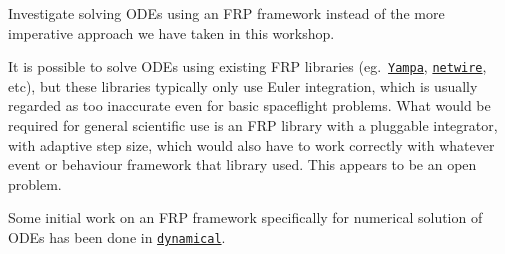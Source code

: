 \documentclass[12pt,openany]{book}
\newcommand{\hspackage}[1]{\href{http://hackage.haskell.org/package/#1}{\texttt{#1}}}
\begin{document}
Investigate solving ODEs using an FRP framework instead of the more imperative approach we have taken in this workshop.

It is possible to solve ODEs using existing FRP libraries (eg.\ \hspackage{Yampa}, \hspackage{netwire}, etc), but these libraries typically only use Euler integration, which is usually regarded as too inaccurate even for basic spaceflight problems. What would be required for general scientific use is an FRP library with a pluggable integrator, with adaptive step size, which would also have to work correctly with whatever event or behaviour framework that library used. This appears to be an open problem.

Some initial work on an FRP framework specifically for numerical solution of ODEs has been done in \href{https://github.com/luke-clifton/dynamical/}{\texttt{dynamical}}.

\printunsrtglossary[type=symbols,style=long]

\clearpage{}
{}


\end{document}
